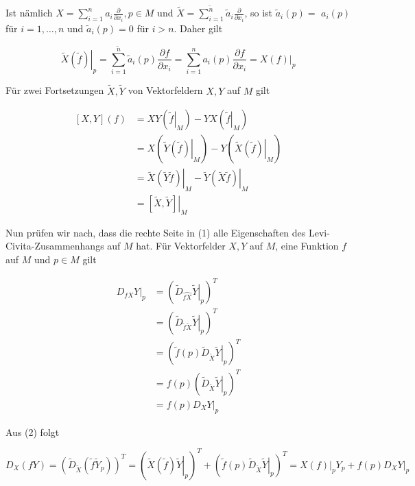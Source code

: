\documentclass[10pt]{article}
\begin{document}
Ist nämlich $X=\sum_{i=1}^{n} a_{i} \frac{\partial}{\partial x_{i}}, p \in M$ und $\tilde{X}=\sum_{i=1}^{\tilde{n}} \tilde{a}_{i} \frac{\partial}{\partial x_{i}}$, so ist $\tilde{a}_{i}(p)=$ $a_{i}(p)$ für $i=1, \ldots, n$ und $\tilde{a}_{i}(p)=0$ für $i>n$. Daher gilt

$$
\left.\tilde{X}(\tilde{f})\right|_{p}=\sum_{i=1}^{\tilde{n}} \tilde{a}_{i}(p) \frac{\partial f}{\partial x_{i}}=\sum_{i=1}^{n} a_{i}(p) \frac{\partial f}{\partial x_{i}}=\left.X(f)\right|_{p}
$$

Für zwei Fortsetzungen $\tilde{X}, \tilde{Y}$ von Vektorfeldern $X, Y$ auf $M$ gilt


\begin{align*}
{[X, Y](f) } & =X Y\left(\left.\tilde{f}\right|_{M}\right)-Y X\left(\left.\tilde{f}\right|_{M}\right) \\
& =X\left(\left.\tilde{Y}(\tilde{f})\right|_{M}\right)-Y\left(\left.\tilde{X}(\tilde{f})\right|_{M}\right) \\
& =\left.\tilde{X}(\tilde{Y} \tilde{f})\right|_{M}-\left.\tilde{Y}(\tilde{X} \tilde{f})\right|_{M} \\
& =\left.[\tilde{X}, \tilde{Y}]\right|_{M} \tag{3}
\end{align*}


Nun prüfen wir nach, dass die rechte Seite in (1) alle Eigenschaften des Levi-Civita-Zusammenhangs auf $M$ hat. Für Vektorfelder $X, Y$ auf $M$, eine Funktion $f$ auf $M$ und $p \in M$ gilt

$$
\begin{aligned}
\left.D_{f X} Y\right|_{p} & =\left(\left.\tilde{D}_{\wideparen{f X}} \tilde{Y}\right|_{p}\right)^{T} \\
& =\left(\left.\tilde{D}_{\tilde{f} \tilde{X}} \tilde{Y}\right|_{p}\right)^{T} \\
& =\left(\left.\tilde{f}(p) \tilde{D}_{\tilde{X}} \tilde{Y}\right|_{p}\right)^{T} \\
& =f(p)\left(\left.\tilde{D}_{\tilde{X}} \tilde{Y}\right|_{p}\right)^{T} \\
& =\left.f(p) D_{X} Y\right|_{p}
\end{aligned}
$$

Aus (2) folgt

$$
D_{X}(f Y)=\left(\tilde{D}_{\tilde{X}}\left(\tilde{f} \tilde{Y}_{p}\right)\right)^{T}=\left(\left.\tilde{X}(\tilde{f}) \tilde{Y}\right|_{p}\right)^{T}+\left(\left.\tilde{f}(p) \tilde{D}_{\tilde{X}} \tilde{Y}\right|_{p}\right)^{T}=\left.X(f)\right|_{p} Y_{p}+\left.f(p) D_{X} Y\right|_{p}
$$
\end{document}
